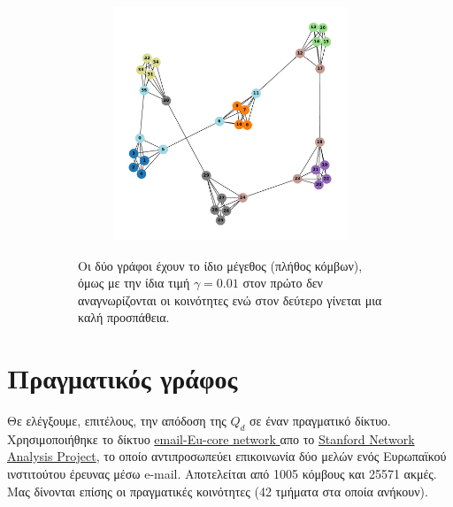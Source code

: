 \documentclass[10pt, letterpaper]{article}
\begin{document}
\begin{figure}
\begin{subfigure}{0.66\linewidth}
\begin{subfigure}{0.45\linewidth}
        \label{}
    \end{subfigure}
    \begin{subfigure}{0.45\linewidth}
        \centering
        \includegraphics[width=\linewidth]{nonconnected_ssize_dcs0.012.pdf}
        \label{}
    \end{subfigure}
    \caption{Οι δύο γράφοι έχουν το ίδιο μέγεθος (πλήθος κόμβων), όμως με την ίδια τιμή 
    $\gamma = 0.01$ στον πρώτο δεν αναγνωρίζονται οι κοινότητες ενώ στον δεύτερο γίνεται 
    μια καλή προσπάθεια.}
    \label{ss_dcs}
  \end{subfigure}
  \caption{}
  \label{endplots}
\end{figure}









\section{Πραγματικός γράφος}





Θε ελέγξουμε, επιτέλους, την απόδοση της $Q_d$ σε έναν πραγματικό δίκτυο. 
Χρησιμοποιήθηκε το δίκτυο \href{https://snap.stanford.edu/data/email-Eu-core.html}{
  \textlatin{email-Eu-core network}
} απο το \href{https://snap.stanford.edu/index.html}{\textlatin{Stanford Network Analysis Project}},
το οποίο αντιπροσωπεύει επικοινωνία δύο μελών ενός Ευρωπαϊκού ινστιτούτου
έρευνας μέσω \textlatin{e-mail}. 
Αποτελείται από 1005 κόμβους και 25571 ακμές.
Μας δίνονται επίσης οι πραγματικές κοινότητες (42 τμήματα στα οποία ανήκουν).
\end{document}
